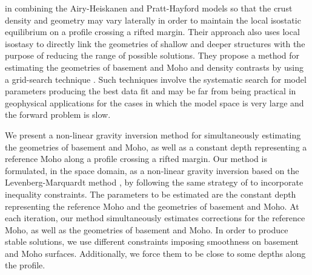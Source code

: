 \documentclass[manuscript,revised]{geophysics}
\begin{document}
in combining the Airy-Heiskanen and Pratt-Hayford models \citep{heiskanen-moritz1967} 
so that the crust density and geometry may vary laterally in order to maintain the local 
isostatic equilibrium on a profile crossing a rifted margin. Their approach also uses local isostasy 
to directly link the geometries of shallow and deeper structures with the purpose of reducing the 
range of possible solutions.
They propose a method for estimating the geometries of basement and Moho and density contrasts by
using a grid-search technique \citep{sen-stoffa2013}.
Such techniques involve the systematic search for model parameters producing the best data fit
and may be far from being practical in geophysical applications for the cases in which
the model space is very large and the forward problem is slow.

We present a non-linear gravity inversion method for simultaneously estimating the 
geometries of basement and Moho, as well as a constant depth representing a reference 
Moho along a profile crossing a rifted margin.
Our method is formulated, in the space domain, as a non-linear gravity inversion
based on the Levenberg-Marquardt method \citep{silva-etal2001, aster-etal2005}, 
by following the same strategy of \citet{barbosa-etal1999} to incorporate
inequality constraints.
The parameters to be estimated are the constant depth representing the
reference Moho and the geometries of basement and Moho.
At each iteration, our method simultaneously estimates corrections for the 
reference Moho, as well as the geometries of basement and Moho. 
In order to produce stable solutions, we use different constraints imposing 
smoothness on basement and Moho surfaces. Additionally, we force them to be 
close to some depths along the profile. 
\end{document}
